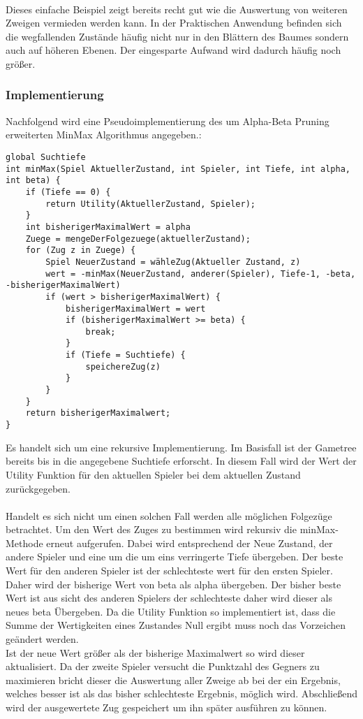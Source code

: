 \paragraph{}  
Dieses einfache Beispiel zeigt bereits recht gut wie die Auswertung von weiteren Zweigen vermieden werden kann. In der Praktischen Anwendung befinden sich die wegfallenden Zustände häufig nicht nur in den Blättern des Baumes sondern auch auf höheren Ebenen. Der eingesparte Aufwand wird dadurch häufig noch größer.  

\subsubsection{Implementierung}
Nachfolgend wird eine Pseudoimplementierung des um Alpha-Beta Pruning erweiterten MinMax Algorithmus angegeben.:
\begin{lstlisting}
global Suchtiefe
int minMax(Spiel AktuellerZustand, int Spieler, int Tiefe, int alpha, int beta) {
	if (Tiefe == 0) {
		return Utility(AktuellerZustand, Spieler);	
	}
	int bisherigerMaximalWert = alpha
	Zuege = mengeDerFolgezuege(aktuellerZustand);
	for (Zug z in Zuege) {
		Spiel NeuerZustand = wähleZug(Aktueller Zustand, z)
		wert = -minMax(NeuerZustand, anderer(Spieler), Tiefe-1, -beta, -bisherigerMaximalWert)
		if (wert > bisherigerMaximalWert) {
			bisherigerMaximalWert = wert
			if (bisherigerMaximalWert >= beta) {
				break;
			}
			if (Tiefe = Suchtiefe) {
				speichereZug(z)
			}
		}
	}
	return bisherigerMaximalwert;		
} 
\end{lstlisting}
Es handelt sich um eine rekursive Implementierung. Im Basisfall ist der Gametree bereits bis in die angegebene Suchtiefe erforscht. In diesem Fall wird der Wert der Utility Funktion für den aktuellen Spieler bei dem aktuellen Zustand zurückgegeben.
\paragraph{}
Handelt es sich nicht um einen solchen Fall werden alle möglichen Folgezüge betrachtet.
Um den Wert des Zuges zu bestimmen wird rekursiv die minMax-Methode erneut aufgerufen. Dabei wird entsprechend der Neue Zustand, der andere Spieler und eine um die um eins verringerte Tiefe übergeben. Der beste Wert für den anderen Spieler ist der schlechteste wert für den ersten Spieler. Daher wird der bisherige Wert von beta als alpha übergeben. Der bisher beste Wert ist aus sicht des anderen Spielers der schlechteste daher wird dieser als neues beta Übergeben. Da die Utility Funktion so implementiert ist, dass die Summe der Wertigkeiten eines Zustandes Null ergibt muss noch das Vorzeichen geändert werden.\\
Ist der neue Wert größer als der bisherige Maximalwert so wird dieser aktualisiert.
Da der zweite Spieler versucht die Punktzahl des Gegners zu maximieren bricht dieser die Auswertung aller Zweige ab bei der ein Ergebnis, welches besser ist als das bisher schlechteste Ergebnis, möglich wird.
Abschließend wird der ausgewertete Zug gespeichert um ihn später ausführen zu können.
